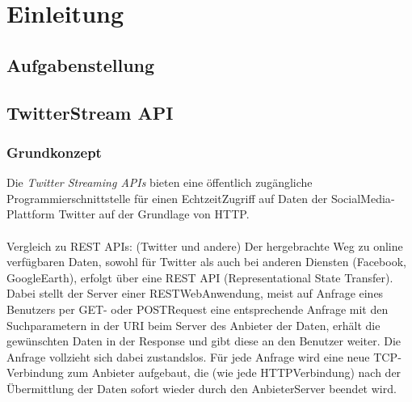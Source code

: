 \chapter{Einleitung}

\section{Aufgabenstellung}
\section{TwitterStream API}
\subsection{Grundkonzept}

Die \textit{Twitter Streaming APIs} bieten eine öffentlich zugängliche Programmierschnittstelle für einen Echtzeit­Zugriff auf Daten der Social­Media­Plattform Twitter auf der Grundlage von HTTP.
\\\\
Vergleich zu REST APIs: (Twitter und andere)
Der hergebrachte Weg zu online verfügbaren Daten, sowohl für Twitter als auch bei anderen
Diensten (Facebook, GoogleEarth), erfolgt über eine REST API (Representational State Transfer).
Dabei stellt der Server einer REST­Web­Anwendung, meist auf Anfrage eines Benutzers per GET-
oder POST­Request eine entsprechende Anfrage mit den Suchparametern in der URI beim Server
des Anbieter der Daten, erhält die gewünschten Daten in der Response und gibt diese an den
Benutzer weiter. Die Anfrage vollzieht sich dabei zustandslos. Für jede Anfrage wird eine neue
TCP­Verbindung zum Anbieter aufgebaut, die (wie jede HTTP­Verbindung) nach der
Übermittlung der Daten sofort wieder durch den Anbieter­Server beendet wird. \\

